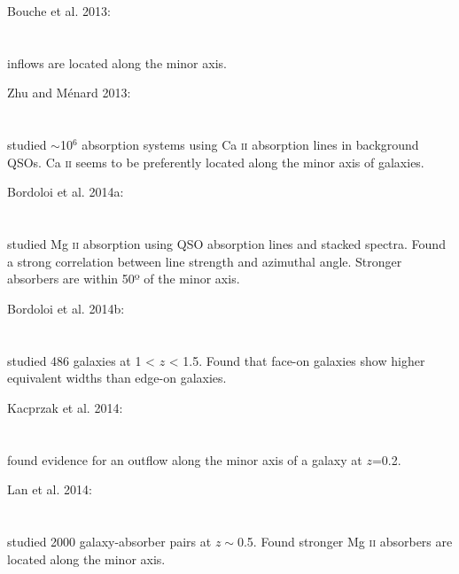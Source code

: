 \hline

Bouche et al. 2013: \\
\citet{2013Sci...341...50B} \\
\citep{2013Sci...341...50B} \\
inflows are located along the minor axis. \\

\hline

Zhu and Ménard 2013: \\
\citet{2013ApJ...773...16Z} \\
\citep{2013ApJ...773...16Z} \\
studied $\sim$10$^{6}$ absorption systems using Ca \textsc{ii} absorption lines
in background QSOs. Ca \textsc{ii} seems to be preferently located along the
minor axis of galaxies. \\

\hline

Bordoloi et al. 2014a: \\
\citet{2014ApJ...784..108B} \\
\citep{2014ApJ...784..108B} \\
studied Mg \textsc{ii} absorption using QSO absorption lines and stacked
spectra. Found a strong correlation between line strength and azimuthal angle.
Stronger absorbers are within 50º of the minor axis. \\

\hline

Bordoloi et al. 2014b: \\
\citet{2014ApJ...794..130B} \\
\citep{2014ApJ...794..130B} \\
studied 486 galaxies at 1 < $z$ < 1.5. Found that face-on galaxies show higher
equivalent widths than edge-on galaxies. \\

\hline

Kacprzak et al. 2014: \\
\citet{2014ApJ...792L..12K} \\
\citep{2014ApJ...792L..12K} \\
found evidence for an outflow along the minor axis of a galaxy at $z$=0.2. \\

\hline

Lan et al. 2014: \\
\citet{2014ApJ...795...31L} \\
\citep{2014ApJ...795...31L} \\
studied 2000 galaxy-absorber pairs at $z\sim$0.5. Found stronger
Mg \textsc{ii} absorbers are located along the minor axis. \\

